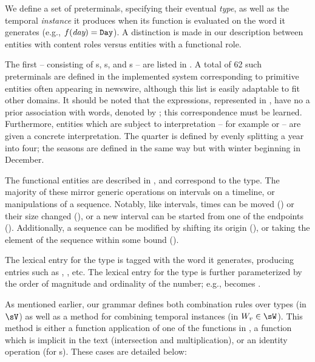 We define a set of preterminals, specifying their eventual
	\textit{type}, as well as the temporal \textit{instance} it
	produces when its function is evaluated on the word it generates
	(e.g., $f(\textit{day}) = \texttt{Day}$).
A distinction is made in our description between entities with 
	content roles versus entities with a functional role.

The first -- consisting of s, s, and s --
	are listed in .
A total of 62 such preterminals are defined in the implemented system
	corresponding to primitive entities often appearing in newswire,
	although this list is easily adaptable to fit other domains.
It should be noted that the expressions, represented in ,
	have no a prior association with words, denoted by ;
	this correspondence must be learned.
Furthermore, entities which are subject to interpretation -- for example
	 or  -- are given a concrete interpretation.
The  quarter is defined by evenly splitting a year into four;
	the seasons are defined in the same way but with winter beginning in December.

The functional entities are described in , and correspond to
	the  type.
The majority of these mirror generic operations on intervals on a timeline,
	or manipulations of a sequence.
Notably, like intervals, times can be moved () or
	their size changed (), or
	a new interval can be started from one of the endpoints
	().
Additionally, a sequence can be modified by shifting its origin
	(), 
	or taking the  element of the sequence within some bound
	().

The lexical entry for the  type is tagged with the word it
	generates, producing entries such as , , etc.
The lexical entry for the  type is further parameterized by
	the order of magnitude and ordinality of the number; e.g.,
	 becomes .


As mentioned earlier, our grammar defines both combination rules
	over types (in $\sV$) as well as a method for combining temporal
	instances (in $W_v \in \sW$).
This method is either a function application of one of the functions in
	, a function which is implicit in the text
	(intersection and multiplication), or an identity operation (for s).
These cases are detailed below:

